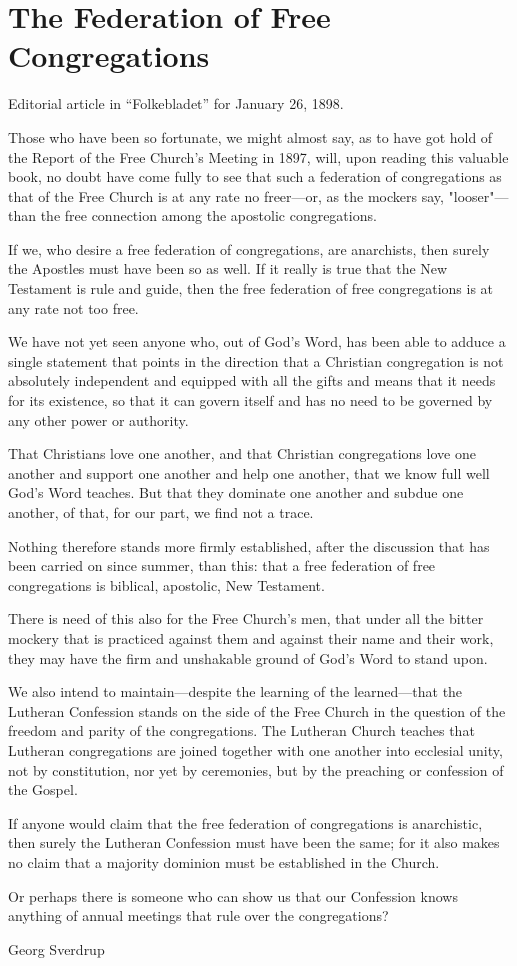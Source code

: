 
\section{The Federation of Free Congregations}

Editorial article in “Folkebladet” for January 26, 1898.

Those who have been so fortunate, we might almost say, as to have got hold of the Report of the Free Church’s Meeting in 1897, will, upon reading this valuable book, no doubt have come fully to see that such a federation of congregations as that of the Free Church is at any rate no freer—or, as the mockers say, "looser"—than the free connection among the apostolic congregations.

If we, who desire a free federation of congregations, are anarchists, then surely the Apostles must have been so as well. If it really is true that the New Testament is rule and guide, then the free federation of free congregations is at any rate not too free.

We have not yet seen anyone who, out of God’s Word, has been able to adduce a single statement that points in the direction that a Christian congregation is not absolutely independent and equipped with all the gifts and means that it needs for its existence, so that it can govern itself and has no need to be governed by any other power or authority.

That Christians love one another, and that Christian congregations love one another and support one another and help one another, that we know full well God’s Word teaches. But that they dominate one another and subdue one another, of that, for our part, we find not a trace.

Nothing therefore stands more firmly established, after the discussion that has been carried on since summer, than this: that a free federation of free congregations is biblical, apostolic, New Testament.

There is need of this also for the Free Church’s men, that under all the bitter mockery that is practiced against them and against their name and their work, they may have the firm and unshakable ground of God’s Word to stand upon.

We also intend to maintain—despite the learning of the learned—that the Lutheran Confession stands on the side of the Free Church in the question of the freedom and parity of the congregations. The Lutheran Church teaches that Lutheran congregations are joined together with one another into ecclesial unity, not by constitution, nor yet by ceremonies, but by the preaching or confession of the Gospel.

If anyone would claim that the free federation of congregations is anarchistic, then surely the Lutheran Confession must have been the same; for it also makes no claim that a majority dominion must be established in the Church.

Or perhaps there is someone who can show us that our Confession knows anything of annual meetings that rule over the congregations?

Georg Sverdrup
